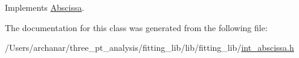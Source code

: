 Implements \mbox{\hyperlink{classAbscissa_a98e122d32d82979bd30338abc15768fd}{Abscissa}}.



The documentation for this class was generated from the following file\+:\begin{DoxyCompactItemize}
\item 
/\+Users/archanar/three\+\_\+pt\+\_\+analysis/fitting\+\_\+lib/lib/fitting\+\_\+lib/\mbox{\hyperlink{lib_2fitting__lib_2int__abscissa_8h}{int\+\_\+abscissa.\+h}}\end{DoxyCompactItemize}
